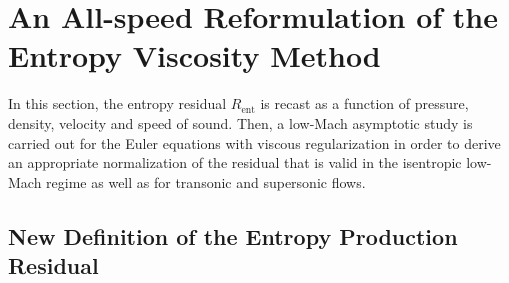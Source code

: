 \documentclass[review,10pt]{elsarticle}
\newcommand{\resi}{R_\text{ent}}
\begin{document}
\section{An All-speed Reformulation of the Entropy Viscosity Method} \label{sec:extension}

In this section, the entropy residual $\resi$ is recast as a function of pressure, density, velocity and speed 
of sound. Then, a low-Mach asymptotic study is carried out for the Euler equations with viscous regularization 
in order to derive an appropriate normalization of the residual that is valid in the isentropic low-Mach regime as well as for 
transonic and supersonic flows. 

\subsection{New Definition of the Entropy Production Residual}\label{sec:new_ent_prod} 
\end{document}
